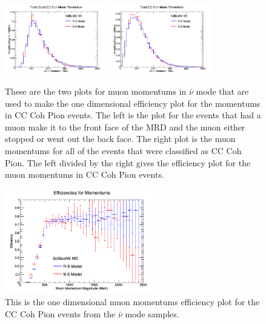 \documentclass[11pt]{article}
\begin{document}
\begin{figure}[H]
\centering
\includegraphics[width=0.4\textwidth]{ANMCombinedPlotsImages/12-ANMCombinedPlots.png}
\includegraphics[width=0.4\textwidth]{ANMCombinedPlotsImages/14-ANMCombinedPlots.png}
\caption{These are the two plots for muon momentums in $\bar{\nu}$ mode that are used to make the one dimensional efficiency plot for the momentums in CC Coh Pion events. The left is the plot for the events that had a muon make it to the front face of the MRD and the muon either stopped or went out the back face. The right plot is the muon momentums for all of the events that were classified as CC Coh Pion. The left divided by the right gives the efficiency plot for the muon momentums in CC Coh Pion events.}
\end{figure}

\begin{figure}[H]
\centering
\includegraphics[width=0.6\textwidth]{ANMCombinedPlotsImages/18-ANMCombinedPlots.png}
\caption{This is the one dimensional muon momentums efficiency plot for the CC Coh Pion events from the $\bar{\nu}$ mode samples.}
\end{figure}
\end{document}
